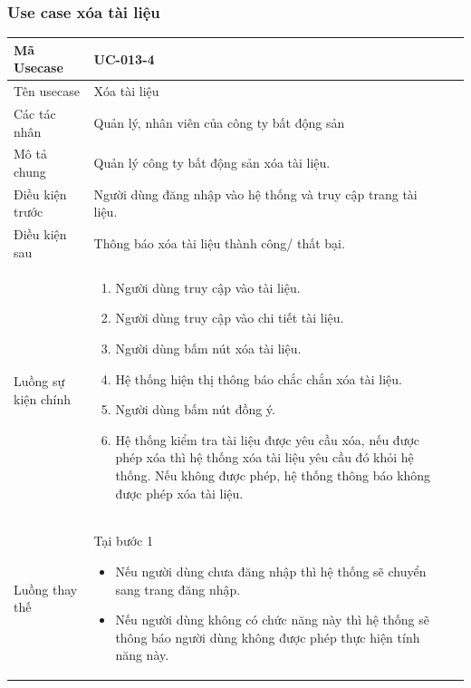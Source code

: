 \documentclass[12pt,a4paper]{article}
\begin{document}
    \subsubsection*{Use case xóa tài liệu }
    \begin{table}[H]
        \centering
        \begin{tabular}{|p{3.5cm}|p{11.5cm}|c|}
            \hline
            Mã Usecase      & UC-013-4                                                      \\
            \hline
            Tên usecase     & Xóa tài liệu                                                  \\
            \hline
            Các tác nhân    & Quản lý, nhân viên của công ty bất động sản                   \\
            \hline
            Mô tả chung     & Quản lý công ty bất động sản xóa tài liệu.                    \\
            \hline

            Điều kiện trước & Người dùng đăng nhập vào hệ thống và truy cập trang tài liệu. \\
            \hline

            Điều kiện sau   & Thông báo xóa tài liệu thành công/ thất bại.                  \\
            \hline

            Luồng sự kiện chính & \vspace{-.8cm}\begin{enumerate}
                                                    \item Người dùng truy cập vào tài liệu.
                                                    \item Người dùng truy cập vào chi tiết tài liệu.
                                                    \item  Người dùng bấm nút xóa tài liệu.
                                                    \item  Hệ thống hiện thị thông báo chắc chắn xóa tài liệu.
                                                    \item  Người dùng bấm nút đồng ý.
                                                    \item Hệ thống kiểm tra tài liệu được yêu cầu xóa, nếu được phép xóa thì hệ thống xóa tài liệu yêu cầu đó khỏi hệ thống. Nếu không được phép, hệ thống thông báo không được phép xóa tài liệu.
            \end{enumerate}
            \\
            \hline
            Luồng thay thế & Tại bước 1\newline
            \vspace{-.8cm}\begin{itemize}
                              \item Nếu người dùng chưa đăng nhập thì hệ thống sẽ chuyển sang trang đăng nhập.
                              \item Nếu người dùng không có chức năng này thì hệ thống sẽ thông báo người dùng không được phép thực hiện tính năng này.
            \end{itemize}


\end{tabular}
\end{table}
\end{document}
